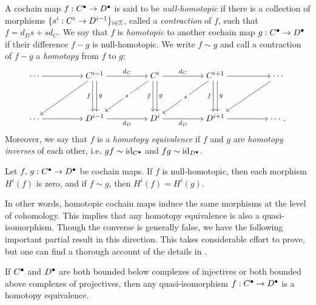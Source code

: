 \begin{definition}
  A cochain map $f: {{C}}^{\bullet} \to {{D}}^{\bullet}$ is said to
  be \emph{null-homotopic} if there is a collection of morphisms
  $\{s^i: C^i \to D^{i - 1}\}_{i \in \mathbb{Z}}$, called a
  \emph{contraction} of $f$, such that $f = d_D s + s d_C$.
  We say that $f$ is \emph{homotopic} to another cochain map $g:
  {{C}}^{\bullet} \to {{D}}^{\bullet}$ if their difference $f - g$ is
  null-homotopic.
  We write $f \sim g$ and call a contraction of $f - g$ a
  \emph{homotopy} from $f$ to $g$:
  \[
    \begin{tikzcd}[cramped]
      \cdots && {C^{i - 1}} && {C^i} && {C^{i + 1}} && \cdots \\
      \\
      \cdots && {D^{i - 1}} && {D^i} && {D^{i + 1}} && \cdots.
      \arrow[from=1-1, to=1-3]
      \arrow["{d_C}", from=1-3, to=1-5]
      \arrow[from=1-3, to=3-1]
      \arrow["{f}"', shift right, from=1-3, to=3-3]
      \arrow["{g}", shift left, from=1-3, to=3-3]
      \arrow["{d_C}", from=1-5, to=1-7]
      \arrow["{s}"{description}, from=1-5, to=3-3]
      \arrow["{f}"', shift right, from=1-5, to=3-5]
      \arrow["{g}", shift left, from=1-5, to=3-5]
      \arrow[from=1-7, to=1-9]
      \arrow["{s}"{description}, from=1-7, to=3-5]
      \arrow["{f}"', shift right, from=1-7, to=3-7]
      \arrow["{g}", shift left, from=1-7, to=3-7]
      \arrow[from=1-9, to=3-7]
      \arrow[from=3-1, to=3-3]
      \arrow["{d_D}"', from=3-3, to=3-5]
      \arrow["{d_D}"', from=3-5, to=3-7]
      \arrow[from=3-7, to=3-9]
    \end{tikzcd}
  \]
  Moreover, we say that $f$ is a \emph{homotopy equivalence} if $f$
  and $g$ are \emph{homotopy inverses} of each other, i.e. $gf \sim
  \operatorname{id}_{{{C}}^{\bullet}}$ and $fg \sim \operatorname{id}_{{{D}}^{\bullet}}$.
\end{definition}

\begin{corollary}
  Let $f,\, g: {{C}}^{\bullet} \to {{D}}^{\bullet}$ be cochain maps.
  If $f$ is null-homotopic, then each morphism $H^i(f)$ is zero, and
  if $f \sim g$, then $H^i(f) = H^i(g)$.
\end{corollary}

In other words, homotopic cochain maps induce the same morphisms at
the level of cohomology.
This implies that any homotopy equivalence is also a quasi-isomorphism.
Though the converse is generally false, we have the following
important partial result in this direction.
This takes considerable effort to prove, but one can find a thorough
account of the details in \cite[Section~IX.5.4]{algebra_chapter_0}.

\begin{proposition}
  \label{prop_qis_is_homotopy_equiv_partial_conv}
  If ${{C}}^{\bullet}$ and ${{D}}^{\bullet}$ are both bounded below
  complexes of injectives or both bounded above complexes of
  projectives, then any quasi-isomorphism $f: {{C}}^{\bullet} \to
  {{D}}^{\bullet}$ is a homotopy equivalence.
\end{proposition}
